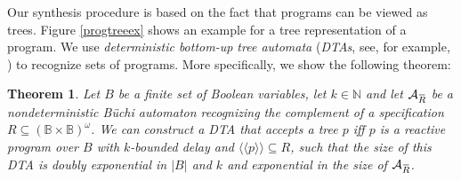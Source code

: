 \documentclass[submission,copyright,creativecommons]{eptcs}
\newtheorem{theorem}{Theorem}
\newcommand{\overbar}[1]{\mkern 1.5mu\overline{\mkern-1.5mu#1\mkern-1.5mu}\mkern 1.5mu}\newcommand{\nothing}{$\,$}
\newcommand{\ignore}[1]{}
\newcommand{\aut}[1]{\mathcal{#1}}
\newcommand{\specaut}{\aut{A}_{\overbar{R}}}
\newcommand{\sembrackk}[1]{\langle\langle #1 \rangle\rangle}\newcommand{\lbar}[1]{\overline{#1}}
\newcommand{\sigmain}{\mathbb{B}}
\newcommand{\sigmaout}{\mathbb{B}}
\begin{document}
Our synthesis procedure is based on the fact that programs can be
viewed as trees.
Figure \ref{progtreeex} shows an example for a tree representation of a
program.
We use \emph{deterministic bottom-up tree automata} (\emph{DTAs},
see, for example, \cite{rozenberg_languages_1997})
to recognize sets of programs.
More specifically, we show the following theorem:
\begin{theorem}\label{dtatheorem}
	Let $B$ be a finite set of Boolean variables,
	let $k \in \mathbb{N}$ and
	let $\specaut$ be a nondeterministic Büchi automaton recognizing the
	complement of a specification
	$R \subseteq \left(\sigmain \times \sigmaout\right)^\omega$.
	We can construct a DTA that accepts
	a tree $p$ iff $p$ is a reactive program over $B$ with $k$-bounded delay
	and $\sembrackk{p} \subseteq R$, such that the size of this DTA
	is doubly exponential in $|B|$ and $k$ and exponential in the size of
	$\specaut$.
\end{theorem}\ignore{TODO: Time complexity?}
\end{document}

